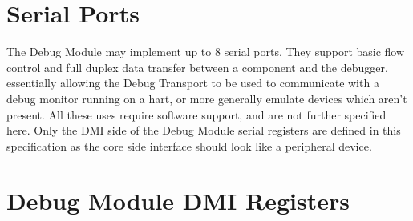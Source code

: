 \section{Serial Ports}

The Debug Module may implement up to 8 serial ports. They support basic flow
control and full duplex data transfer between a component and the debugger,
essentially allowing the Debug Transport to be used to communicate
with a debug monitor running on a hart, or more generally emulate devices which
aren't present. All these uses require software support, and are not further specified here.
Only the DMI side of the Debug Module serial registers are defined in this
specification as the core side interface should look like a peripheral device.

\section{Debug Module DMI Registers} \label{dmdebbus}



